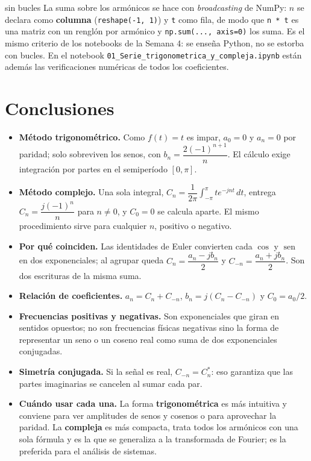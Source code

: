 \documentclass[11pt,a4paper]{article}
\DeclareMathOperator{\sen}{sen}
\newcommand{\py}[1]{\texttt{#1}}
\begin{document}
\begin{notatec}{sin bucles}
La suma sobre los armónicos se hace con \emph{broadcasting} de NumPy: $n$ se declara como
\textbf{columna} (\py{reshape(-1, 1)}) y \py{t} como fila, de modo que
\py{n * t} es una matriz con un renglón por armónico y \py{np.sum(..., axis=0)} los
suma. Es el mismo criterio de los notebooks de la Semana 4: se enseña Python, no se
estorba con bucles. En el notebook \texttt{01\_Serie\_trigonometrica\_y\_compleja.ipynb}
están además las verificaciones numéricas de todos los coeficientes.
\end{notatec}

\FloatBarrier
\section{Conclusiones}
\begin{itemize}
    \item \textbf{Método trigonométrico.} Como $f(t)=t$ es impar, $a_0=0$ y $a_n=0$ por
          paridad; solo sobreviven los senos, con $b_n=\dfrac{2(-1)^{n+1}}{n}$. El cálculo
          exige integración por partes en el semiperíodo $[0,\pi]$.
    \item \textbf{Método complejo.} Una sola integral,
          $C_n=\dfrac{1}{2\pi}\displaystyle\int_{-\pi}^{\pi}te^{-jnt}\,dt$, entrega
          $C_n=\dfrac{j(-1)^{n}}{n}$ para $n\neq0$, y $C_0=0$ se calcula aparte. El mismo
          procedimiento sirve para cualquier $n$, positivo o negativo.
    \item \textbf{Por qué coinciden.} Las identidades de Euler convierten cada $\cos$ y
          $\sen$ en dos exponenciales; al agrupar queda $C_n=\dfrac{a_n-jb_n}{2}$ y
          $C_{-n}=\dfrac{a_n+jb_n}{2}$. Son dos escrituras de la misma suma.
    \item \textbf{Relación de coeficientes.} $a_n=C_n+C_{-n}$, $b_n=j(C_n-C_{-n})$ y
          $C_0=a_0/2$.
    \item \textbf{Frecuencias positivas y negativas.} Son exponenciales que giran en
          sentidos opuestos; no son frecuencias físicas negativas sino la forma de
          representar un seno o un coseno real como suma de dos exponenciales conjugadas.
    \item \textbf{Simetría conjugada.} Si la señal es real, $C_{-n}=C_n^{*}$: eso garantiza
          que las partes imaginarias se cancelen al sumar cada par.
    \item \textbf{Cuándo usar cada una.} La forma \textbf{trigonométrica} es más intuitiva
          y conviene para ver amplitudes de senos y cosenos o para aprovechar la paridad.
          La \textbf{compleja} es más compacta, trata todos los armónicos con una sola
          fórmula y es la que se generaliza a la transformada de Fourier; es la preferida
          para el análisis de sistemas.
\end{itemize}
\end{document}
